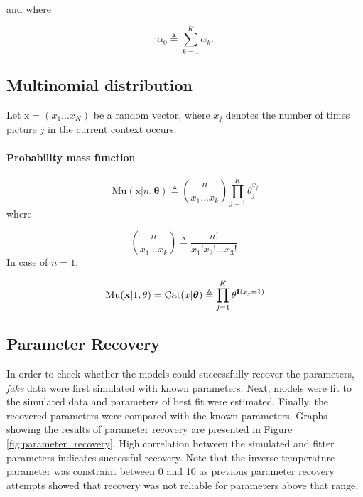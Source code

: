 \documentclass[a4paper,12pt]{article}
\begin{document}
and where


\begin{equation}
\alpha_0 \triangleq \sum_{k=1}^K\alpha_k.
\end{equation}


\subsection*{Multinomial distribution}

Let $\boldsymbol{\mathrm{x}}=(x_1...x_K)$ be a random vector, where $x_j$ denotes the number of times picture $j$ in the current context occurs.

\paragraph*{Probability mass function}

\begin{equation}
\mathrm{Mu}(\boldsymbol{\mathrm{x}}|n,\boldsymbol{\theta}) \triangleq \binom{n}{x_1...x_k} \prod^{K}_{j=1}\theta_j^{x_j}
\end{equation}
where

\begin{equation}
 \binom{n}{x_1...x_k}\triangleq\dfrac{n!}{x_1!x_2!...x_3!}.
\end{equation}
In case of $n=1$:

\begin{equation}
\mathrm{Mu}(\boldsymbol{\mathrm{x}}|1,\mathbf{\theta})= \mathrm{Cat}(x|\boldsymbol{\theta})\triangleq \prod^K_{j=1}\theta^{\bold{I}(x_j=1)}
\end{equation}

%
% 


\subsection*{Parameter Recovery}
In order to check whether the models could successfully recover the parameters, \textit{fake} data were first simulated with known parameters. Next, models were fit to the simulated data and parameters of best fit were estimated. Finally, the recovered parameters were compared with the known parameters. Graphs showing the results of parameter recovery are presented in Figure \ref{fig:parameter_recovery}. High correlation between the simulated and fitter parameters indicates successful recovery. Note that the inverse temperature parameter was constraint between 0 and 10 as previous parameter recovery attempts showed that recovery was not reliable for parameters above that range. 
\end{document}
